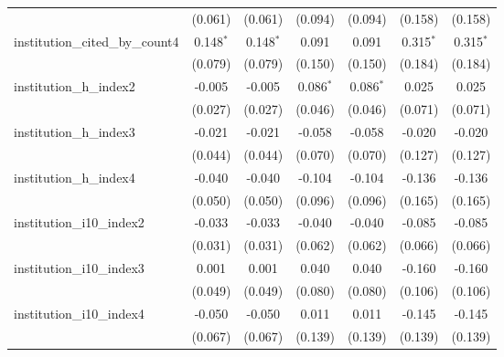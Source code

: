 \begin{tabular}{lcccccc}
                                         & (0.061)        & (0.061)        & (0.094)        & (0.094)        & (0.158)        & (0.158)\\   
   institution\_cited\_by\_count4        & 0.148$^{*}$    & 0.148$^{*}$    & 0.091          & 0.091          & 0.315$^{*}$    & 0.315$^{*}$\\   
                                         & (0.079)        & (0.079)        & (0.150)        & (0.150)        & (0.184)        & (0.184)\\   
   institution\_h\_index2                & -0.005         & -0.005         & 0.086$^{*}$    & 0.086$^{*}$    & 0.025          & 0.025\\   
                                         & (0.027)        & (0.027)        & (0.046)        & (0.046)        & (0.071)        & (0.071)\\   
   institution\_h\_index3                & -0.021         & -0.021         & -0.058         & -0.058         & -0.020         & -0.020\\   
                                         & (0.044)        & (0.044)        & (0.070)        & (0.070)        & (0.127)        & (0.127)\\   
   institution\_h\_index4                & -0.040         & -0.040         & -0.104         & -0.104         & -0.136         & -0.136\\   
                                         & (0.050)        & (0.050)        & (0.096)        & (0.096)        & (0.165)        & (0.165)\\   
   institution\_i10\_index2              & -0.033         & -0.033         & -0.040         & -0.040         & -0.085         & -0.085\\   
                                         & (0.031)        & (0.031)        & (0.062)        & (0.062)        & (0.066)        & (0.066)\\   
   institution\_i10\_index3              & 0.001          & 0.001          & 0.040          & 0.040          & -0.160         & -0.160\\   
                                         & (0.049)        & (0.049)        & (0.080)        & (0.080)        & (0.106)        & (0.106)\\   
   institution\_i10\_index4              & -0.050         & -0.050         & 0.011          & 0.011          & -0.145         & -0.145\\   
                                         & (0.067)        & (0.067)        & (0.139)        & (0.139)        & (0.139)        & (0.139)\\   

\end{tabular}
